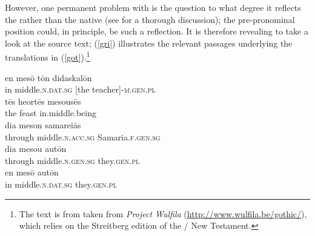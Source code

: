 \documentclass[output=paper,colorlinks,citecolor=brown]{langscibook}
\begin{document}
However, one permanent problem with   is the question to what degree it reflects  the   rather than the native  (see \citealt{ratkus2011} for a thorough discussion); the pre-pronominal position could, in principle, be such a reflection.   
 It is therefore revealing to take a look at the  source text; (\ref{gri}) illustrates the relevant passages underlying the  translations in (\ref{got}).\footnote{The  text is from taken from \textit{Project Wulfila} (\url{http://www.wulfila.be/gothic/}), which relies on the Streitberg edition of the / New Testament. }

 
\begin{exe}
   \ex \label{gri}  
    \begin{xlist}
         \ex \gll en mes\={o} { t\=on didaskal\=on}    \\ 
           in middle.\textsc{n.dat.sg} [{the teacher}]-\textsc{m.gen.pl}  \\
    {\color{gray} \ex \label{grib}  \gll  t\=es heort\=es mesous\={e}s     \\  
      the feast  in.middle.being      \\  }
          \ex \gll dia meson samarei\=as     \\ 
           through  middle.\textsc{n.acc.sg} Samaria.\textsc{f.gen.sg}  \\ 
          \ex \label{grid}  \gll dia mesou aut\=on   \\  
             through  middle.\textsc{n.gen.sg} they.\textsc{gen.pl} \\
         \ex \label{grie}  \gll en mes\=o aut\=on \\  
          in middle.\textsc{n.dat.sg} they.\textsc{gen.pl} \\
    \end{xlist}
\end{exe} 
\end{document}
